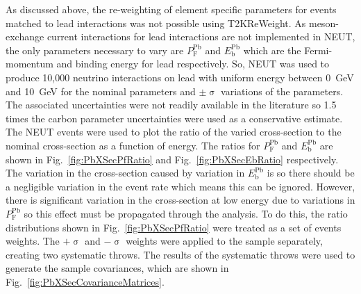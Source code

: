 As discussed above, the re-weighting of element specific parameters for events matched to lead interactions was not possible using T2KReWeight.  As meson-exchange current interactions for lead interactions are not implemented in NEUT, the only parameters necessary to vary are $P_{\textrm{F}}^{\textrm{Pb}}$ and $E_{\textrm{b}}^{\textrm{Pb}}$ which are the Fermi-momentum and binding energy for lead respectively.  So, NEUT was used to produce 10,000 neutrino interactions on lead with uniform energy between 0~GeV and 10~GeV for the nominal parameters and $\pm\upsigma$ variations of the parameters.  The associated uncertainties were not readily available in the literature so 1.5 times the carbon parameter uncertainties were used as a conservative estimate.  The NEUT events were used to plot the ratio of the varied cross-section to the nominal cross-section as a function of energy.  The ratios for $P_{\textrm{F}}^{\textrm{Pb}}$ and $E_{\textrm{b}}^{\textrm{Pb}}$ are shown in Fig.~\ref{fig:PbXSecPfRatio} and Fig.~\ref{fig:PbXSecEbRatio} respectively.  The variation in the cross-section caused by variation in $E_{\textrm{b}}^{\textrm{Pb}}$ is  so there should be a negligible variation in the event rate which means this can be ignored.  However, there is significant variation in the cross-section at low energy due to variations in $P_{\textrm{F}}^{\textrm{Pb}}$ so this effect must be propagated through the analysis.  To do this, the ratio distributions shown in Fig.~\ref{fig:PbXSecPfRatio} were treated as a set of events weights.  The $+\upsigma$ and $-\upsigma$ weights were applied to the sample separately, creating two systematic throws.  The results of the systematic throws were used to generate the sample covariances, which are shown in Fig.~\ref{fig:PbXSecCovarianceMatrices}.
